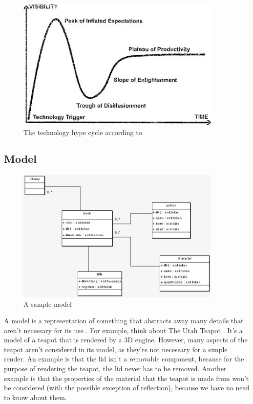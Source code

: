 \begin{figure}
\includegraphics[width=4in]{figures/mde_pos.jpg}
\caption{The technology hype cycle according to \citet{brambillaBook}}
\label{mde_pos}
\end{figure}

\subsection{Model}

\begin{figure}
\includegraphics[width=4in]{figures/sample_model.jpg}
\caption{A sample model}
\label{A sample UML model}
\end{figure}

A model is a representation of something that abstracts away many details that aren't necessary for its use \citep{brambillaBook}. For example, think about The Utah Teapot \citep{utahTeapot}. It's a model of a teapot that is rendered by a 3D engine. However, many aspects of the teapot aren't considered in its model, as they're not necessary for a simple render. An example is that the lid isn't a removable component, because for the purpose of rendering the teapot, the lid never has to be removed. Another example is that the properties of the material that the teapot is made from won't be considered (with the possible exception of reflection), because we have no need to know about them.

